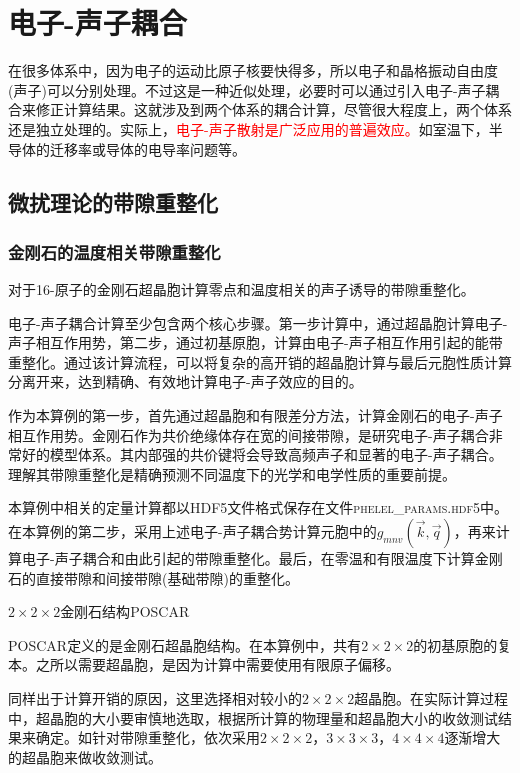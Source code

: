 \section{电子-声子耦合}
在很多体系中，因为电子的运动比原子核要快得多，所以电子和晶格振动自由度(声子)可以分别处理。不过这是一种近似处理，必要时可以通过引入电子-声子耦合来修正计算结果。这就涉及到两个体系的耦合计算，尽管很大程度上，两个体系还是独立处理的。实际上，\textcolor{red}{电子-声子散射是广泛应用的普遍效应。}如室温下，半导体的迁移率或导体的电导率问题等。

\subsection{微扰理论的带隙重整化}
\subsubsection{金刚石的温度相关带隙重整化}
对于16-原子的金刚石超晶胞计算零点和温度相关的声子诱导的带隙重整化。

电子-声子耦合计算至少包含两个核心步骤。第一步计算中，通过超晶胞计算电子-声子相互作用势，第二步，通过初基原胞，计算由电子-声子相互作用引起的能带重整化。通过该计算流程，可以将复杂的高开销的超晶胞计算与最后元胞性质计算分离开来，达到精确、有效地计算电子-声子效应的目的。

作为本算例的第一步，首先通过超晶胞和有限差分方法，计算金刚石的电子-声子相互作用势。金刚石作为共价绝缘体存在宽的间接带隙，是研究电子-声子耦合非常好的模型体系。其内部强的共价键将会导致高频声子和显著的电子-声子耦合。理解其带隙重整化是精确预测不同温度下的光学和电学性质的重要前提。

本算例中相关的定量计算都以\textrm{HDF5}文件格式保存在文件\textsc{phelel\_params.hdf5}中。在本算例的第二步，采用上述电子-声子耦合势计算元胞中的$g_{mnv}(\vec k,\vec q)$，再来计算电子-声子耦合和由此引起的带隙重整化。最后，在零温和有限温度下计算金刚石的直接带隙和间接带隙(基础带隙)的重整化。

$2\times2\times2$金刚石结构\textrm{POSCAR}

\textrm{POSCAR}定义的是金刚石超晶胞结构。在本算例中，共有$2\times2\times2$的初基原胞的复本。之所以需要超晶胞，是因为计算中需要使用有限原子偏移。

同样出于计算开销的原因，这里选择相对较小的$2\times2\times2$超晶胞。在实际计算过程中，超晶胞的大小要审慎地选取，根据所计算的物理量和超晶胞大小的收敛测试结果来确定。如针对带隙重整化，依次采用$2\times2\times2$，$3\times3\times3$，$4\times4\times4$逐渐增大的超晶胞来做收敛测试。

